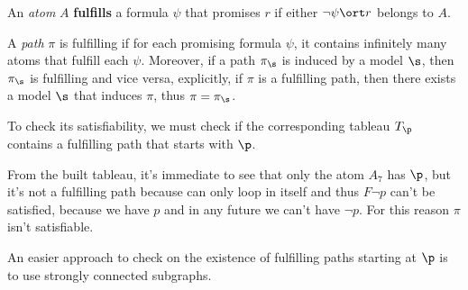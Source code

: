 \documentclass[oneside]{academica}
\begin{document}
\begin{definition*}[Fulfillment]
  An \textit{atom} $A$ \textbf{fulfills} a formula $\psi$ that promises $r$ if either $\neg \psi \ort r$ belongs to $A$.

  \bigskip
  A \textit{path} $\pi$ is fulfilling if for each promising formula $\psi$, it contains infinitely many atoms that fulfill each $\psi$.
  Moreover, if a path $\pi_\s$ is induced by a model $\s$, then $\pi_\s$ is fulfilling and vice versa, explicitly, if $\pi$ is a fulfilling path, then there exists a model $\s$ that induces $\pi$, thus $\pi = \pi_\s$.
\end{definition*}


\begin{question*}[Is $\p = Gp \land F \neg p$ satisfiable?]
  To check its satisfiability, we must check if the corresponding tableau $T_\p$ contains a fulfilling path that starts with $\p$.
  \begin{center}
    
  \end{center}
  From the built tableau, it's immediate to see that only the atom $A_7$ has $\p$, but it's not a fulfilling path because can only loop in itself and thus $F\neg p$ can't be satisfied, because we have $p$ and in any future we can't have $\neg p$.
  For this reason $\pi$ isn't satisfiable.
\end{question*}

An easier approach to check on the existence of fulfilling paths starting at $\p$ is to use strongly connected subgraphs.
\end{document}
